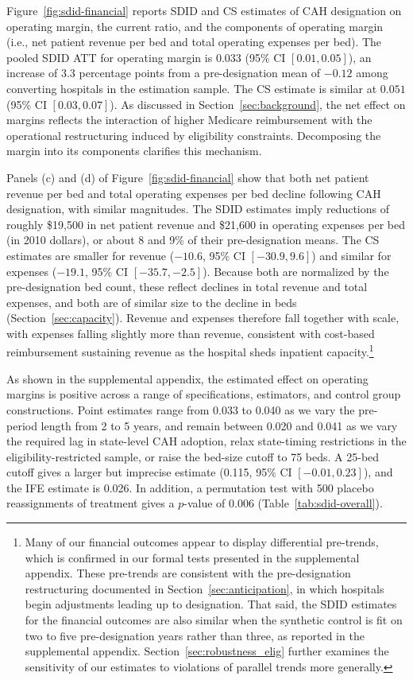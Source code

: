 \documentclass[a4paper, 12pt, twoside]{article}
\begin{document}
Figure~\ref{fig:sdid-financial} reports SDID and CS estimates of CAH designation on operating margin, the current ratio, and the components of operating margin (i.e., net patient revenue per bed and total operating expenses per bed). The pooled SDID ATT for operating margin is $0.033$ (95\% CI $[0.01, 0.05]$), an increase of 3.3 percentage points from a pre-designation mean of $-0.12$ among converting hospitals in the estimation sample. The CS estimate is similar at $0.051$ (95\% CI $[0.03, 0.07]$). As discussed in Section~\ref{sec:background}, the net effect on margins reflects the interaction of higher Medicare reimbursement with the operational restructuring induced by eligibility constraints. Decomposing the margin into its components clarifies this mechanism.

Panels (c) and (d) of Figure~\ref{fig:sdid-financial} show that both net patient revenue per bed and total operating expenses per bed decline following CAH designation, with similar magnitudes. The SDID estimates imply reductions of roughly \$19,500 in net patient revenue and \$21,600 in operating expenses per bed (in 2010 dollars), or about 8 and 9\% of their pre-designation means. The CS estimates are smaller for revenue ($-10.6$, 95\% CI $[-30.9, 9.6]$) and similar for expenses ($-19.1$, 95\% CI $[-35.7, -2.5]$). Because both are normalized by the pre-designation bed count, these reflect declines in total revenue and total expenses, and both are of similar size to the decline in beds (Section~\ref{sec:capacity}). Revenue and expenses therefore fall together with scale, with expenses falling slightly more than revenue, consistent with cost-based reimbursement sustaining revenue as the hospital sheds inpatient capacity.\footnote{Many of our financial outcomes appear to display differential pre-trends, which is confirmed in our formal tests presented in the supplemental appendix. These pre-trends are consistent with the pre-designation restructuring documented in Section~\ref{sec:anticipation}, in which hospitals begin adjustments leading up to designation. That said, the SDID estimates for the financial outcomes are also similar when the synthetic control is fit on two to five pre-designation years rather than three, as reported in the supplemental appendix. Section~\ref{sec:robustness_elig} further examines the sensitivity of our estimates to violations of parallel trends more generally.}

As shown in the supplemental appendix, the estimated effect on operating margins is positive across a range of specifications, estimators, and control group constructions. Point estimates range from 0.033 to 0.040 as we vary the pre-period length from 2 to 5 years, and remain between 0.020 and 0.041 as we vary the required lag in state-level CAH adoption, relax state-timing restrictions in the eligibility-restricted sample, or raise the bed-size cutoff to 75 beds. A 25-bed cutoff gives a larger but imprecise estimate (0.115, 95\% CI $[-0.01, 0.23]$), and the IFE estimate is 0.026. In addition, a permutation test with 500 placebo reassignments of treatment gives a $p$-value of 0.006 (Table~\ref{tab:sdid-overall}).
\end{document}
